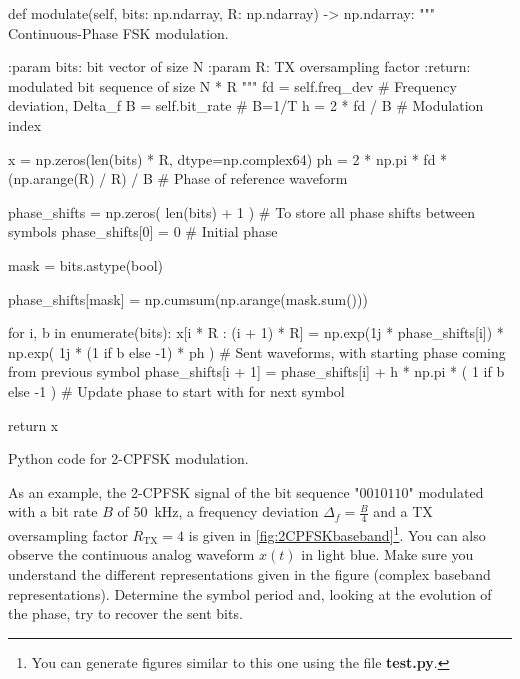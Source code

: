 \begin{listing}[H]
    \begin{python}
    def modulate(self, bits: np.ndarray, R: np.ndarray) -> np.ndarray:
        """
        Continuous-Phase FSK modulation.

        :param bits: bit vector of size N
        :param R: TX oversampling factor
        :return: modulated bit sequence of size N * R
        """
        fd = self.freq_dev  # Frequency deviation, Delta_f
        B = self.bit_rate  # B=1/T
        h = 2 * fd / B  # Modulation index

        x = np.zeros(len(bits) * R, dtype=np.complex64)
        ph = 2 * np.pi * fd * (np.arange(R) / R) / B  # Phase of reference waveform

        phase_shifts = np.zeros(
            len(bits) + 1
        )  # To store all phase shifts between symbols
        phase_shifts[0] = 0  # Initial phase

        mask = bits.astype(bool)

        phase_shifts[mask] = np.cumsum(np.arange(mask.sum()))

        for i, b in enumerate(bits):
            x[i * R : (i + 1) * R] = np.exp(1j * phase_shifts[i]) * np.exp(
                1j * (1 if b else -1) * ph
            )  # Sent waveforms, with starting phase coming from previous symbol
            phase_shifts[i + 1] = phase_shifts[i] + h * np.pi * (
                1 if b else -1
            )  # Update phase to start with for next symbol

        return x
\end{python}
\caption{Python code for 2-CPFSK modulation.}
\label{fig:code_mod}
\end{listing}



As an example, the 2-CPFSK signal of the bit sequence "$0010110$" modulated with a bit rate $B$ of \SI{50}{\kilo\hertz}, a frequency deviation $\Delta_f=\frac{B}{4}$ and a TX oversampling factor $R_{\text{TX}}=4$ is given in \autoref{fig:2CPFSKbaseband}\footnote{You can generate figures similar to this one using the file \textbf{test.py}.}. You can also observe the continuous analog waveform $x(t)$ in light blue. Make sure you understand the different representations given in the figure (complex baseband representations). Determine the symbol period and, looking at the evolution of the phase, try to recover the sent bits.

